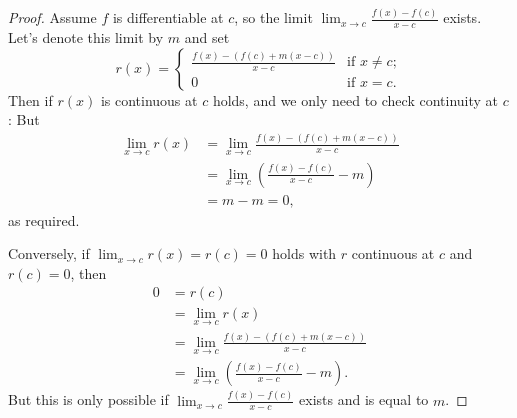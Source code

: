 \documentclass[10pt, a4paper]{article}
\begin{document}
\begin{lemma}[continues = pre:analy:lem:firstordertaylorindiffdef]
    \begin{proof}
        Assume $f$ is differentiable at $c$,
        so the limit $\lim_{x \rightarrow c}\frac{f(x) - f(c)}{x - c}$ exists.
        Let's denote this limit by $m$ and set
        \[
        r(x) = \begin{cases}
            \frac{f(x) - (f(c) + m(x - c))}{x - c} & \text{if } x \neq c; \\
            0 & \text{if } x = c.
        \end{cases}
        \]
        Then if $r(x)$ is continuous at $c$ holds,
        and we only need to check continuity at $c$:
        But
        \begin{align*}
            \lim_{x \rightarrow c}r(x) &= \lim_{x \rightarrow c}\frac{f(x) - (f(c) + m(x - c))}{x - c} \\
            &= \lim_{x \rightarrow c}\left(\frac{f(x) - f(c)}{x - c} - m\right) \\
            &= m - m = 0,
        \end{align*}
        as required.

        Conversely,
        if $\lim_{x \rightarrow c}r(x) = r(c) = 0$ holds with $r$ continuous at $c$ and $r(c) = 0$,
        then
        \begin{align*}
            0 &= r(c) \\
            &= \lim_{x \rightarrow c}r(x) \\
            &= \lim_{x \rightarrow c}\frac{f(x) - (f(c) + m(x - c))}{x - c} \\
            &= \lim_{x \rightarrow c}\left(\frac{f(x) - f(c)}{x - c} - m\right).
        \end{align*}
        But this is only possible if $\lim_{x \rightarrow c}\frac{f(x) - f(c)}{x - c}$ exists and is equal to $m$.
    \end{proof}
\end{lemma}
\end{document}
